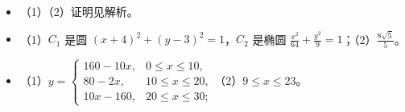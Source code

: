 \begin{itemize}[leftmargin=2.6em]
  \item[\textbf{22.}] （1）（2）证明见解析。
  \item[\textbf{23.}] （1）$C_1$ 是圆 $(x+4)^2+(y-3)^2=1$，$C_2$ 是椭圆 $\frac{x^2}{64}+\frac{y^2}{9}=1$；（2）$\frac{8\sqrt5}{5}$。
  \item[\textbf{24.}] （1）$y=\begin{cases}160-10x,&0\leqslant x\leqslant10,\\ 80-2x,&10\leqslant x\leqslant20,\\ 10x-160,&20\leqslant x\leqslant30;\end{cases}$（2）$9\leqslant x\leqslant23$。
\end{itemize}
